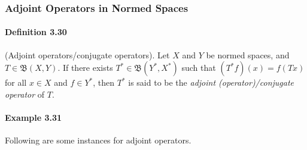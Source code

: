 \documentclass{article}
\begin{document}
\subsubsection{Adjoint Operators in Normed Spaces}
\paragraph{Definition 3.30\label{def:3.30}} (Adjoint operators/conjugate operators). Let $X$ and $Y$ be normed spaces, and $T\in\mathfrak{B}(X,Y)$. If there exists $T^*\in\mathfrak{B}(Y^*,X^*)$ such that $(T^*f)(x)=f(Tx)$ for all $x\in X$ and $f\in Y^*$, then $T^*$ is said to be the \textit{adjoint (operator)/conjugate operator} of $T$.

\paragraph{Example 3.31\label{example:3.31}} Following are some instances for adjoint operators.
\end{document}
